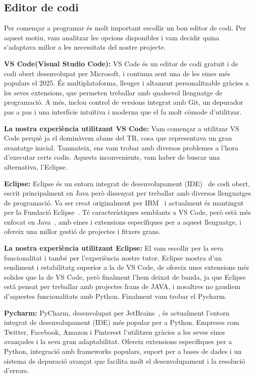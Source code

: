 \subsection{Editor de codi}
Per començar a programar és molt important escollir un bon editor de codi. Per aquest motiu, vam analitzar les opcions disponibles i vam decidir quina s’adaptava millor a les necessitats del nostre projecte.

\textbf{VS Code(Visual Studio Code): }
VS Code és un editor de codi gratuït i de codi obert desenvolupat per Microsoft, i continua sent una de les eines més populars el 2025. És multiplataforma, lleuger i altament personalitzable gràcies a les seves extensions, que permeten treballar amb qualsevol llenguatge de programació. A més, inclou control de versions integrat amb Git, un depurador pas a pas i una interfície intuïtiva i moderna que el fa molt còmode d’utilitzar.

\textbf{La nostra experiència utilitzant VS Code:}
Vam començar a utilitzar VS Code perquè ja el dominàvem abans del TR, cosa que representava un gran avantatge inicial. Tanmateix, ens vam trobar amb diversos problemes a l'hora d'executar certs codis. Aquests inconvenients, vam haber de buscar una alternativa, l'Eclipse.

\textbf{Eclipse: }
Eclipse és un entorn integrat de desenvolupament (IDE)~\cite{IDE} de codi obert, escrit principalment en Java però dissenyat per treballar amb diversos llenguatges de programació. Va ser creat originalment per IBM~\cite{IBM_} i actualment és mantingut per la Fundació Eclipse~\cite{Fundation}. Té característiques semblants a VS Code, però està més enfocat en Java~\cite{JAVA}, amb eines i extensions específiques per a aquest llenguatge, i ofereix una millor gestió de projectes i fitxers grans.

\textbf{La nostra experiència utilitzant Eclipse:}
El vam escollir per la seva funcionalitat i també per l'experiència nostre tutor. Eclipse mostra d'un rendiment i estabilitatg superior a la de VS Code, de ofereix unes extensions més solides que la de VS Code, però finalment l'hem deixat de banda, ja que Eclipse estâ pensat per treballar amb projectes frans de JAVA, i nosaltres no gaudiem d'aquestes funcionalitats amb Python. Finalment vam trobar el Pycharm.

\textbf{Pycharm: }
PyCharm, desenvolupat per JetBrains~\cite{Jet}, és actualment l’entorn integrat de desenvolupament (IDE) més popular per a Python. Empreses com Twitter, Facebook, Amazon i Pinterest l’utilitzen gràcies a les seves eines avançades i la seva gran adaptabilitat. Ofereix extensions específiques per a Python, integració amb frameworks populars, suport per a bases de dades i un sistema de depuració avançat que facilita molt el desenvolupament i la resolució d’errors.

